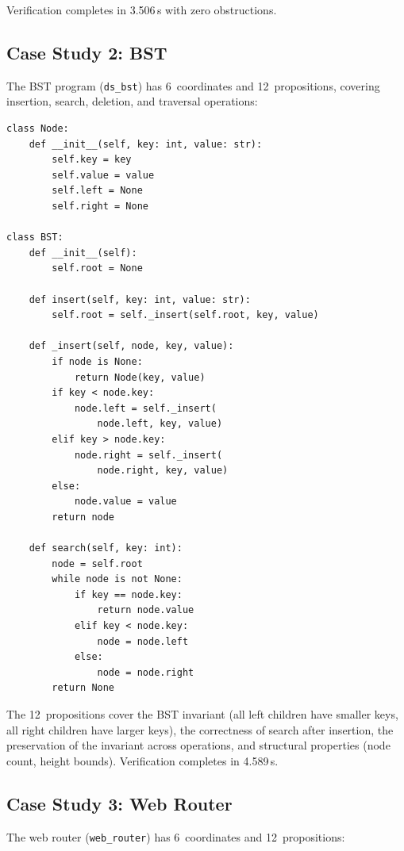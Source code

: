 \documentclass[11pt]{article}
\begin{document}
Verification completes in 3.506\,s with zero obstructions.

\subsection{Case Study 2: BST}

The BST program (\texttt{ds\_bst}) has 6~coordinates and
12~propositions, covering insertion, search, deletion, and
traversal operations:

\begin{lstlisting}[style=jugeo-python,caption={Binary search tree (excerpt).}]
class Node:
    def __init__(self, key: int, value: str):
        self.key = key
        self.value = value
        self.left = None
        self.right = None

class BST:
    def __init__(self):
        self.root = None

    def insert(self, key: int, value: str):
        self.root = self._insert(self.root, key, value)

    def _insert(self, node, key, value):
        if node is None:
            return Node(key, value)
        if key < node.key:
            node.left = self._insert(
                node.left, key, value)
        elif key > node.key:
            node.right = self._insert(
                node.right, key, value)
        else:
            node.value = value
        return node

    def search(self, key: int):
        node = self.root
        while node is not None:
            if key == node.key:
                return node.value
            elif key < node.key:
                node = node.left
            else:
                node = node.right
        return None
\end{lstlisting}

The 12~propositions cover the BST invariant (all left children
have smaller keys, all right children have larger keys), the
correctness of search after insertion, the preservation of the
invariant across operations, and structural properties (node
count, height bounds).  Verification completes in 4.589\,s.

\subsection{Case Study 3: Web Router}

The web router (\texttt{web\_router}) has 6~coordinates and
12~propositions:
\end{document}
